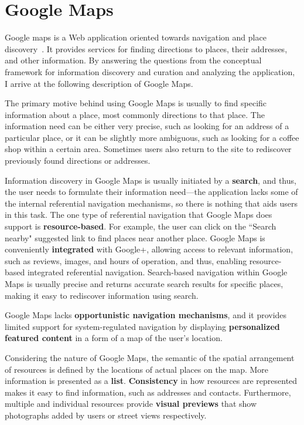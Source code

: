 {\section{Google Maps}
Google maps is a Web application oriented towards navigation and place discovery~\cite{gibson2006google}. It provides services for finding directions to places, their addresses, and other information. By answering the questions from the conceptual framework for information discovery and curation and analyzing the application, I arrive at the following description of Google Maps.

The primary motive behind using Google Maps is usually to find specific information about a place, most commonly directions to that place. The information need can be either very precise, such as looking for an address of a particular place, or it can be slightly more ambiguous, such as looking for a coffee shop within a certain area. Sometimes users also return to the site to rediscover previously found directions or addresses.

Information discovery in Google Maps is usually initiated by a \textbf{search}, and thus, the user needs to formulate their information need---the application lacks some of the internal referential navigation mechanisms, so there is nothing that aids users in this task. The one type of referential navigation that Google Maps does support is \textbf{resource-based}. For example, the user can click on the ``Search nearby" suggested link to find places near another place. Google Maps is conveniently \textbf{integrated} with Google+, allowing access to relevant information, such as reviews, images, and hours of operation, and thus, enabling resource-based integrated referential navigation. Search-based navigation within Google Maps is usually precise and returns accurate search results for specific places, making it easy to rediscover information using search. 

Google Maps lacks \textbf{opportunistic navigation mechanisms}, and it provides limited support for system-regulated navigation by displaying \textbf{personalized featured content} in a form of a map of the user's location.  

Considering the nature of Google Maps, the semantic of the spatial arrangement of resources is defined by the locations of actual places on the map. More information is presented as a \textbf{list}. \textbf{Consistency} in how resources are represented makes it easy to find information, such as addresses and contacts. Furthermore, multiple and individual resources provide \textbf{visual previews} that show photographs added by users or street views respectively.

}
